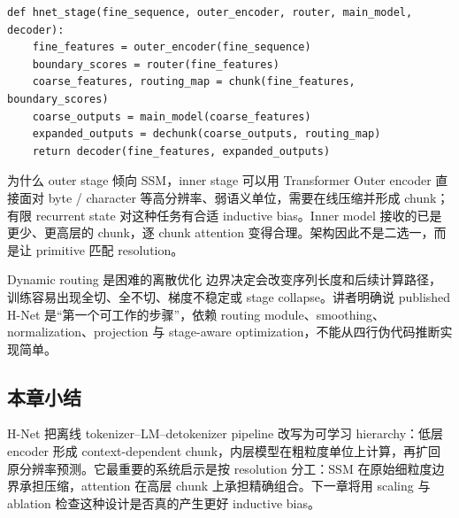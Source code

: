 
\begin{lstlisting}[caption={H-Net 单层 hierarchy 的教学版数据流}]
def hnet_stage(fine_sequence, outer_encoder, router, main_model, decoder):
    fine_features = outer_encoder(fine_sequence)
    boundary_scores = router(fine_features)
    coarse_features, routing_map = chunk(fine_features, boundary_scores)
    coarse_outputs = main_model(coarse_features)
    expanded_outputs = dechunk(coarse_outputs, routing_map)
    return decoder(fine_features, expanded_outputs)
\end{lstlisting}

\begin{knowledgebox}{为什么 outer stage 倾向 SSM，inner stage 可以用 Transformer}
Outer encoder 直接面对 byte / character 等高分辨率、弱语义单位，需要在线压缩并形成 chunk；有限 recurrent state 对这种任务有合适 inductive bias。Inner model 接收的已是更少、更高层的 chunk，逐 chunk attention 变得合理。架构因此不是二选一，而是让 primitive 匹配 resolution。
\end{knowledgebox}

\begin{warningbox}{Dynamic routing 是困难的离散优化}
边界决定会改变序列长度和后续计算路径，训练容易出现全切、全不切、梯度不稳定或 stage collapse。讲者明确说 published H-Net 是“第一个可工作的步骤”，依赖 routing module、smoothing、normalization、projection 与 stage-aware optimization，不能从四行伪代码推断实现简单。
\end{warningbox}


\subsection{本章小结}

H-Net 把离线 tokenizer--LM--detokenizer pipeline 改写为可学习 hierarchy：低层 encoder 形成 context-dependent chunk，内层模型在粗粒度单位上计算，再扩回原分辨率预测。它最重要的系统启示是按 resolution 分工：SSM 在原始细粒度边界承担压缩，attention 在高层 chunk 上承担精确组合。下一章将用 scaling 与 ablation 检查这种设计是否真的产生更好 inductive bias。

